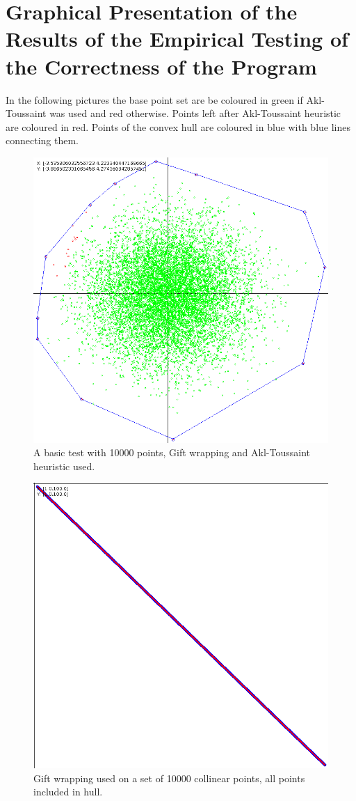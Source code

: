 \documentclass[a4paper,12pt,leqno,titlepage]{article}
\begin{document}
\section{Graphical Presentation of the Results of the Empirical Testing of the Correctness of the Program}
In the following pictures the base point set are be coloured in green if Akl-Toussaint was used and red otherwise.
Points left after Akl-Toussaint heuristic are coloured in red.
Points of the convex hull are coloured in blue with blue lines connecting them.

\begin{figure}[h!]
\caption{A basic test with 10000 points, Gift wrapping and Akl-Toussaint heuristic used.} %
\centering
\includegraphics[width=\textwidth]{test10000.png}
\end{figure}

\pagebreak

\begin{figure}[t!]
\caption{Gift wrapping used on a set of 10000 collinear points, all points included in hull.} %
\label{fig:colli1}
\centering
\includegraphics[width=.6\textwidth]{line10000.png}
\end{figure}
\end{document}
